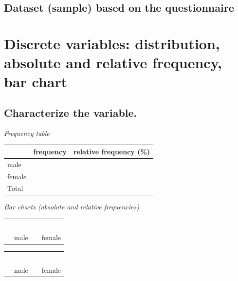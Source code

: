 \subsection{Dataset (sample) based on the questionnaire}
\begin{center}
\large
	
\end{center}

\section{Discrete variables: distribution, absolute and relative frequency, bar chart}



\subsection{Characterize the  variable.}

\begin{minipage}{0.48\textwidth}
	\emph{Frequency table}
	
	\begin{center}
		\begin{tabular}{l|l|l}
		\toprule
				& frequency	&relative frequency (\%)\\
		\midrule		
		male&&\\
		female&&\\
		\midrule
		Total&&\\
		\bottomrule
		\end{tabular}
	\end{center}
\end{minipage}
\hfill
\begin{minipage}{0.48\textwidth}
	\emph{Bar charts (absolute and relative frequencies)}\smallskip
	
	\begin{tabular}{|llll}
	&&\\\\\\\\\\
	\hline
	\multicolumn{1}{l}{}& male && female
	\end{tabular}
	\quad\quad
		\begin{tabular}{|llll}
		&&\\\\\\\\\\
		\hline
		\multicolumn{1}{l}{}& male && female
		\end{tabular}
\end{minipage}
	
